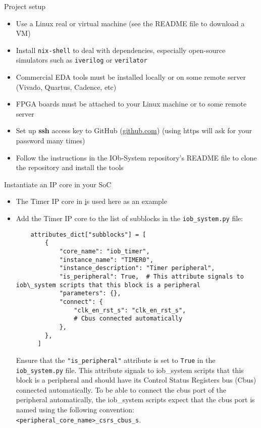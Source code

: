 \documentclass [xcolor=svgnames, t] {beamer}
\begin{document}
\begin{frame}{Project setup}
\begin{center}
  \begin{itemize}
  \item Use a Linux real or virtual machine (see the README file to download a VM)
    \item Install {\tt nix-shell} to deal with dependencies, especially open-source simulators such as {\tt iverilog} or {\tt verilator} 
    \item Commercial EDA tools must be installed locally or on some remote server (Vivado, Quartus, Cadence, etc) 
    \item FPGA boards must be attached to your Linux machine or to some remote server
    \item Set up {\bf ssh} access key to GitHub (\url{github.com}) (using https will ask for your password many times)
    \item Follow the instructions in the IOb-System repository's README file to clone the repository and install the tools
  \end{itemize}
\end{center}
\end{frame}


\begin{frame}{Instantiate an IP core in your SoC}
  \begin{itemize}
  \item The Timer IP core in \href{https://github.com/IObundle/py2hwsw/tree/main/py2hwsw/lib/peripherals/iob_timer} is used here as an example
  \item Add the Timer IP core to the list of subblocks in the {\tt iob\_system.py} file:\\
    \begin{lstlisting}
    attributes_dict["subblocks"] = [
        {
            "core_name": "iob_timer",
            "instance_name": "TIMER0",
            "instance_description": "Timer peripheral",
            "is_peripheral": True,  # This attribute signals to iob\_system scripts that this block is a peripheral
            "parameters": {},
            "connect": {
                "clk_en_rst_s": "clk_en_rst_s",
                # Cbus connected automatically
            },
        },
      ]
    \end{lstlisting}
      Ensure that the {\tt "is\_peripheral"} attribute is set to {\tt True} in the {\tt iob\_system.py} file. This attribute signals to iob\_system scripts that this block is a peripheral and should have its Control Status Registers bus (Cbus) connected automatically.
      To be able to connect the cbus port of the peripheral automatically, the iob\_system scripts expect that the cbus port is named using the following convention: {\tt <peripheral\_core\_name>\_csrs\_cbus\_s}.
  \end{itemize}
\end{frame}
\end{document}
